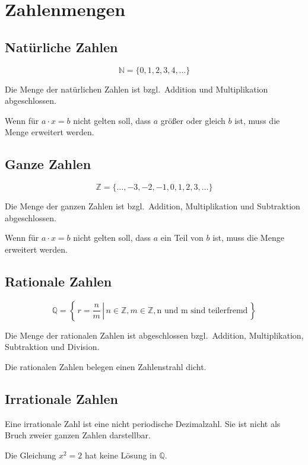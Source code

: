 \section{Zahlenmengen}

\subsection{Natürliche Zahlen}

\[
	\mathbb{N} = \{ 0, 1, 2, 3, 4, \ldots \}
\]

Die Menge der natürlichen Zahlen ist bzgl.\ Addition und Multiplikation abgeschlossen.

Wenn für \( a \cdot x = b \) nicht gelten soll, dass \( a \) größer oder gleich \( b \) ist, muss die Menge erweitert werden.

\subsection{Ganze Zahlen}

\[
	\mathbb{Z} = \{ \ldots, -3, -2, -1, 0, 1, 2, 3, \ldots \}
\]

Die Menge der ganzen Zahlen ist bzgl.\ Addition, Multiplikation und Subtraktion abgeschlossen.

Wenn für \( a \cdot x = b \) nicht gelten soll, dass \( a \) ein Teil von \( b \) ist, muss die Menge erweitert werden.

\subsection{Rationale Zahlen}

\[
	\mathbb{Q} = \left \{\, r = \left. \frac{n}{m} \, \right| \, n \in \mathbb{Z}, m \in \mathbb{Z},
	\text{n und m sind teilerfremd} \, \right \}
\]

Die Menge der rationalen Zahlen ist abgeschlossen bzgl.\ Addition, Multiplikation, Subtraktion und Division.

Die rationalen Zahlen belegen einen Zahlenstrahl dicht.

\subsection{Irrationale Zahlen}

Eine irrationale Zahl ist eine nicht periodische Dezimalzahl.
Sie ist nicht als Bruch zweier ganzen Zahlen darstellbar.

Die Gleichung \( x^2 = 2 \) hat keine Lösung in \( \mathbb{Q} \).


